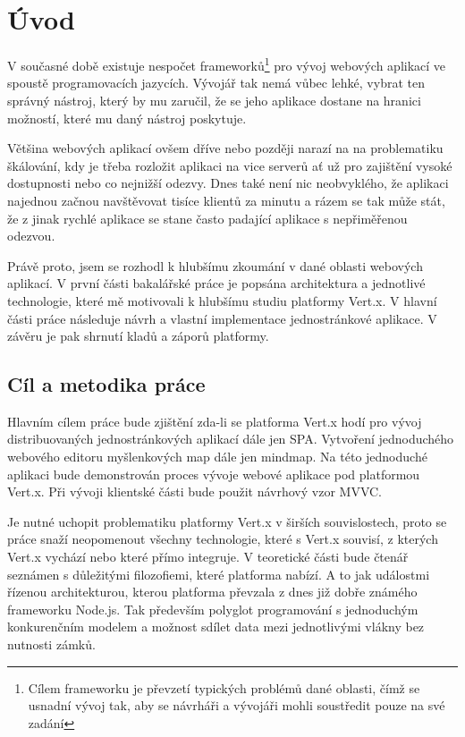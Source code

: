 

\chapter{Úvod}

V současné době existuje nespočet frameworků\footnote{Cílem frameworku je převzetí typických problémů dané oblasti, čímž se usnadní vývoj tak, aby se návrháři a vývojáři mohli soustředit pouze na své zadání} pro vývoj webových aplikací ve spoustě programovacích jazycích. Vývojář tak nemá vůbec lehké, vybrat ten správný nástroj, který by mu zaručil, že se jeho aplikace dostane na hranici možností, které mu daný nástroj poskytuje. 

Většina webových aplikací ovšem dříve nebo později narazí na na problematiku škálování, kdy je třeba rozložit aplikaci na vice serverů ať už pro zajištění vysoké dostupnosti nebo co nejnižší odezvy. Dnes také není nic neobvyklého, že aplikaci najednou začnou navštěvovat tisíce klientů za minutu a rázem se tak může stát, že z jinak rychlé aplikace se stane často padající aplikace s nepřiměřenou odezvou.

Právě proto, jsem se rozhodl k hlubšímu zkoumání v dané oblasti webových aplikací. V první části bakalářské práce je popsána architektura a jednotlivé technologie, které mě motivovali k hlubšímu studiu platformy Vert.x. V hlavní části práce následuje návrh a vlastní implementace jednostránkové aplikace. V závěru je pak shrnutí kladů a záporů platformy. 

\section{Cíl a metodika práce}

Hlavním cílem práce bude zjištění zda-li se  platforma Vert.x hodí pro vývoj distribuovaných jednostránkových aplikací dále jen SPA. Vytvoření jednoduchého webového editoru myšlenkových map dále jen mindmap. %
Na této jednoduché aplikaci bude demonstrován proces vývoje webové aplikace pod platformou Vert.x. Při vývoji klientské části bude použit návrhový vzor MVVC.

Je nutné uchopit problematiku platformy Vert.x v širších souvislostech, proto se práce snaží neopomenout všechny technologie, které s Vert.x souvisí, z kterých Vert.x vychází nebo které přímo integruje. V teoretické části bude čtenář seznámen s důležitými filozofiemi, které platforma nabízí. A to jak událostmi řízenou architekturou, kterou platforma převzala z dnes již dobře známého frameworku Node.js. Tak především polyglot programování s jednoduchým konkurenčním modelem a možnost sdílet data mezi jednotlivými vlákny bez nutnosti zámků.


